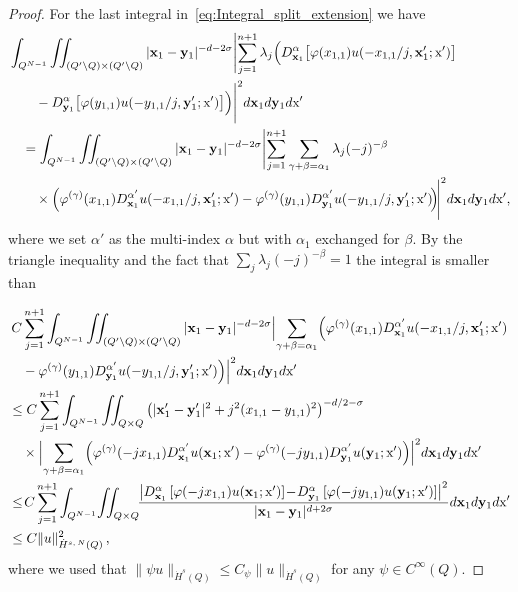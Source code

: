 \documentclass[AHL, Unicode, longabstracts, published]{cedram}
\newcommand\1{{\ensuremath {\mathds 1} }}
\newcommand{\bx}{\mathbf{x}}
\newcommand{\by}{\mathbf{y}}
\newcommand{\sx}{\textup{x}}
\begin{document}
\begin{proof}
For the last integral in~\eqref{eq:Integral_split_extension} we have
\begin{align*}
&\int_{Q^{N-1}}
\iint_{(Q'\setminus Q)\times (Q'\setminus Q)} |\bx_1-\by_1|^{-d-2\sigma}\Biggl|\sum_{j=1}^{n+1}\lambda_j \Bigl(D^\alpha_{\bx_1} \bigl[\varphi(x_{1,1}) u(-x_{1,1}/j, \bx_1';\sx')\bigr]\\
&\qquad -D^\alpha_{\by_1} \bigl[\varphi(y_{1,1}) u(-y_{1,1}/j, \by_1';\sx')\bigr]\Bigr)\Biggr|^2 d\bx_1 d\by_1 d\sx'\\
&\quad=
\int_{Q^{N-1}}\iint_{(Q'\setminus Q)\times (Q'\setminus Q)} |\bx_1-\by_1|^{-d-2\sigma}
\Biggl|\sum_{j=1}^{n+1}\sum_{\gamma+\beta=\alpha_1}\lambda_j(-j)^{-\beta}\\
&\qquad \times \Bigl(\varphi^{(\gamma)}(x_{1,1}) D_{\bx_1}^{\alpha'}u(-x_{1,1}/j, \bx_1';\sx') -\varphi^{(\gamma)}(y_{1,1}) D_{\by_1}^{\alpha'}u(-y_{1,1}/j, \by_1';\sx')\!\Bigr)\!\Biggr|^2 d\bx_1 d\by_1 d\sx',
\end{align*}
where we set $\alpha'$ as the multi-index $\alpha$ but with $\alpha_1$ exchanged for $\beta$. By the triangle inequality and the fact that $\sum_{j}\lambda_j(-j)^{-\beta}=1$ the integral is smaller than


\begin{multline*}
C\sum_{j=1}^{n+1}\int_{Q^{N-1}}\iint_{(Q'\setminus Q)\times (Q'\setminus Q)} |\bx_1-\by_1|^{-d-2\sigma}\Bigl|\sum_{\gamma+\beta=\alpha_1}\Bigl(\varphi^{(\gamma)}(x_{1,1}) D_{\bx_1}^{\alpha'}u(-x_{1,1}/j, \bx_1';\sx')\\
\begin{aligned}
&\quad -\varphi^{(\gamma)}(y_{1,1}) D_{\by_1}^{\alpha'}u(-y_{1,1}/j, \by_1';\sx')\Bigr)\Bigr|^2 d\bx_1 d\by_1 d\sx'\\
&\leq C\sum_{j=1}^{n+1}\int_{Q^{N-1}}\iint_{Q\times Q} \left(|\bx_1'-\by_1'|^2+j^2(x_{1,1}-y_{1,1})^2\right)^{-d/2-\sigma}\\
&\quad \times
\Bigl|\sum_{\gamma+\beta=\alpha_1}\Bigl(\varphi^{(\gamma)}(-j x_{1,1}) D_{\bx_1}^{\alpha'}u(\bx_1; \sx') -\varphi^{(\gamma)}(- j y_{1,1}) D_{\by_1}^{\alpha'}u(\by_1; \sx')\Bigr)\Bigr|^2 d\bx_1 d\by_1 d\sx'\\
&\leq\!C\sum_{j=1}^{n+1}\int_{Q^{N-1}}\!\iint_{Q\times Q}\!\! \frac{\left|D^\alpha_{\bx_1}\left[\varphi(-j x_{1,1})u(\bx_1; \sx')\right]\!-\!D^\alpha_{\by_1}\left[\varphi(- j y_{1,1}) u(\by_1; \sx')\right]\right|^2}{|\bx_1-\by_1|^{d+2\sigma}} d\bx_1 d\by_1 d\sx'\\
& \leq C \|u\|_{\dot{H}^{s,\,N}(Q)}^2\,,
\end{aligned}
\end{multline*}
where we used that $\|\psi u\|_{\dot{H}^s(Q)}\leq C_\psi \|u\|_{\dot{H}^s(Q)}$ for any $\psi\in C^\infty(Q).$
\goodbreak



\end{proof}
\end{document}
